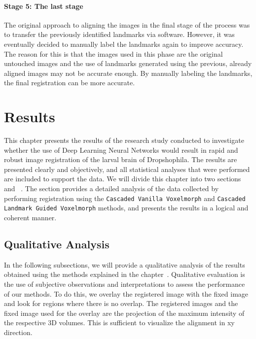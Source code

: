 \documentclass{book}
\begin{document}
	\subsubsection{Stage 5: The last stage}
	The original approach to aligning the images in the final stage of the process was to transfer the previously identified landmarks via software. However, it was eventually decided to manually label the landmarks again to improve accuracy. The reason for this is that the images used in this phase are the original untouched images and the use of landmarks generated using the previous, already aligned images may not be accurate enough. By manually labeling the landmarks, the final registration can be more accurate.
	
	\chapter{Results}\label{chapter:results}
	This chapter presents the results of the research study conducted to investigate whether the use of Deep Learning Neural Networks would result in rapid and robust image registration of the larval brain of Dropshophila. The results are presented clearly and objectively, and all statistical analyses that were performed are included to support the data. We will divide this chapter into two sections ~ and ~. The  section provides a detailed analysis of the data collected by performing registration using the \texttt{Cascaded Vanilla Voxelmorph} and \texttt{Cascaded Landmark Guided Voxelmorph} methods, and presents the results in a logical and coherent manner.
	
	\section{Qualitative Analysis} \label{sec:Qualitative}
	In the following subsections, we will provide a qualitative analysis of the results obtained using the methods explained in the chapter~. Qualitative evaluation is the use of subjective observations and interpretations to assess the performance of our methods. To do this, we overlay the registered image with the fixed image and look for regions where there is no overlap. The registered images and the fixed image used for the overlay are the projection of the maximum intensity of the respective 3D volumes. This is sufficient to visualize the alignment in xy direction.
	
\end{document}
